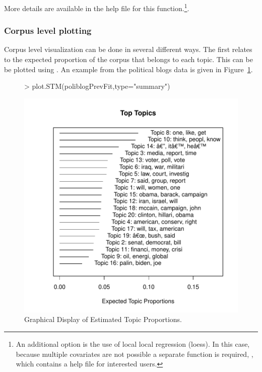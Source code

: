 \documentclass[nojss]{jss}
\begin{document}
More details are available in the help file for this function.\footnote{An additional option is the use of local local regression (loess). In this case, because multiple covariates are not possible a separate function is required, , which contains a help file for interested users.}.


\subsubsection{Corpus level plotting}

Corpus level visualization can be done in several different ways. The first relates to the expected proportion of the corpus that belongs to each topic. This can be be plotted using . An example from the political blogs data is given in Figure~\ref{fig:summary}.

\begin{figure}[t!]
\begin{center}
\begin{Schunk}
\begin{Sinput}
> plot.STM(poliblogPrevFit,type="summary")
\end{Sinput}
\end{Schunk}
\includegraphics{stmVignette-023}
\caption{Graphical Display of Estimated Topic Proportions.}
\label{fig:summary}
\end{center}
\end{figure}
\end{document}
